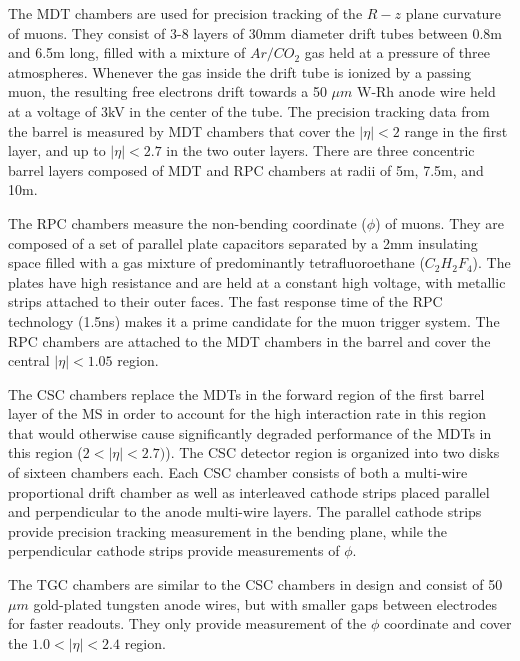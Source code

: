 The MDT chambers are used for precision tracking of the $R-z$ plane curvature of muons.
They consist of 3-8 layers of 30mm diameter drift tubes between 0.8m and 6.5m long, filled with a mixture of $Ar/CO_2$ gas held at a pressure of three atmospheres.
Whenever the gas inside the drift tube is ionized by a passing muon, the resulting free electrons drift towards a 50 $\mu m$ W-Rh anode wire held at a voltage of 3kV in the center of the tube.
The precision tracking data from the barrel is measured by MDT chambers that cover the $|\eta| < 2$ range in the first layer, and up to $|\eta| < 2.7$ in the two outer layers.
There are three concentric barrel layers composed of MDT and RPC chambers at radii of 5m, 7.5m, and 10m.

The RPC chambers measure the non-bending coordinate ($\phi$) of muons.
They are composed of a set of parallel plate capacitors separated by a 2mm insulating space filled with a gas mixture of predominantly tetrafluoroethane ($C_2 H_2 F_4$). 
The plates have high resistance and are held at a constant high voltage, with metallic strips attached to their outer faces.
The fast response time of the RPC technology (1.5ns) makes it a prime candidate for the muon trigger system.
The RPC chambers are attached to the MDT chambers in the barrel and cover the central $|\eta| < 1.05$ region.

The CSC chambers replace the MDTs in the forward region of the first barrel layer of the MS in order to account for the high interaction rate in this region that would otherwise cause significantly degraded performance of the MDTs in this region ($2 < |\eta| < 2.7)$).
The CSC detector region is organized into two disks of sixteen chambers each.
Each CSC chamber consists of both a multi-wire proportional drift chamber as well as interleaved cathode strips placed parallel and perpendicular to the anode multi-wire layers.
The parallel cathode strips provide precision tracking measurement in the bending plane, while the perpendicular cathode strips provide measurements of $\phi$.

The TGC chambers are similar to the CSC chambers in design and consist of 50 $\mu m$ gold-plated tungsten anode wires, but with smaller gaps between electrodes for faster readouts.
They only provide measurement of the $\phi$ coordinate and cover the $1.0 < |\eta| < 2.4$ region.

